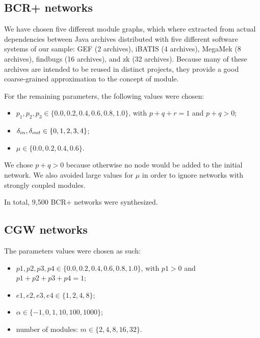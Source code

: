 \subsection{BCR+ networks}

We have chosen five different module graphs, which where extracted from actual
dependencies between Java archives distributed with five different software
systems of our sample: GEF (2 archives), iBATIS (4 archives), MegaMek (8
archives), findbugs (16 archives), and zk (32 archives). Because many of these
archives are intended to be reused in distinct projects, they provide a good
coarse-grained approximation to the concept of module.


For the remaining parameters, the following values were chosen:

\begin{itemize}
\item $p_1, p_2, p_3 \in \{0.0, 0.2, 0.4, 0.6, 0.8, 1.0\}$, with $p + q + r = 1$ and
$p + q > 0$;
\item $\delta_{in}, \delta_{out} \in \{0, 1, 2, 3, 4\}$;
\item $\mu \in \{0.0, 0.2, 0.4, 0.6\}$.
\end{itemize}

We chose $p + q > 0$ because otherwise no node would be added to the initial
network. We also avoided large values for $\mu$ in order to ignore networks with
strongly coupled modules. 

In total, 9,500 BCR+ networks were synthesized.

\subsection{CGW networks}

The parameters values were chosen as such:

\begin{itemize}
\item $p1, p2, p3, p4 \in \{0.0, 0.2, 0.4, 0.6, 0.8, 1.0\}$, with $p1 > 0$ and
$p1 + p2 + p3 + p4 = 1$;
\item $e1, e2, e3, e4 \in \{1, 2, 4, 8\}$;
\item $\alpha \in \{-1, 0, 1, 10, 100, 1000\}$;
\item number of modules: $m \in \{2, 4, 8, 16, 32\}$.
\end{itemize}

